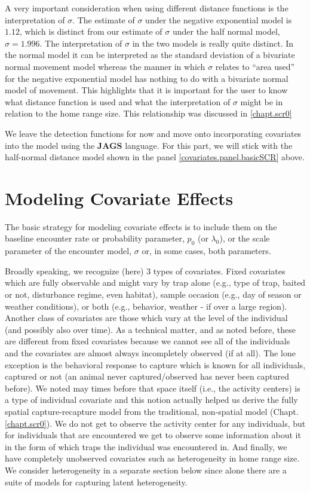 A very important consideration when using different distance functions is the
interpretation of $\sigma$.  The estimate of $\sigma$ under the negative exponential model is
$1.12$, which is distinct from our
estimate of $\sigma$ under the half normal model, $\sigma = 1.996$.
The interpretation
of $\sigma$ in the two models is really quite distinct. In the normal
model it can be interpreted as the standard deviation of a bivariate
normal movement model whereas the manner in which $\sigma$ relates to
``area used'' for the negative exponential model has nothing to do
with a bivariate normal model of movement.  This highlights that it is
important for the user to know what distance function is used and what
the interpretation of $\sigma$ might be in relation to the home range size.
This relationship was discussed in \ref{chapt.scr0}

We leave the detection functions for now and move onto incorporating
covariates into the model using the {\bf JAGS}
language.  For this part, we will stick with the half-normal distance
model shown in the panel \ref{covariates.panel.basicSCR} above.


\section{Modeling Covariate Effects}

The basic strategy for modeling covariate effects is to include them
on the baseline encounter rate or probability parameter, $p_{0}$ (or
$\lambda_{0}$), or the scale parameter of the encounter model,
$\sigma$ or, in some cases, both parameters.

Broadly speaking, we recognize (here) 3 types of covariates. Fixed
covariates which are fully observable and might vary by trap alone
(e.g., type of trap, baited or not, disturbance regime, even habitat),
sample occasion (e.g., day of season or weather conditions), or both
(e.g., behavior, weather - if over a large region).  Another class
of covariates are those which vary at the level of the individual (and
possibly also over time).  As a technical matter, and as noted before,
these are different from fixed covariates because we cannot see all of
the individuals and the covariates are almost always incompletely
observed (if at all).  The lone exception is the behavioral response
to capture which is known for all individuals, captured or not (an
animal never captured/observed has never been captured before).  We
noted may times before that space itself (i.e., the activity centers)
is a type of individual covariate and this notion actually helped us
derive the fully spatial capture-recapture model from the traditional,
non-spatial model (Chapt. \ref{chapt.scr0}). We do not get to observe
the activity center for any individuals, but for individuals that are
encountered we get to observe some information about it in the form of
which traps the individual was encountered in.  And finally, we have
completely unobserved covariates such as heterogeneity in home range
size.  We consider heterogeneity in a separate section below since 
alone there are 
a suite of models for capturing latent heterogeneity. 

